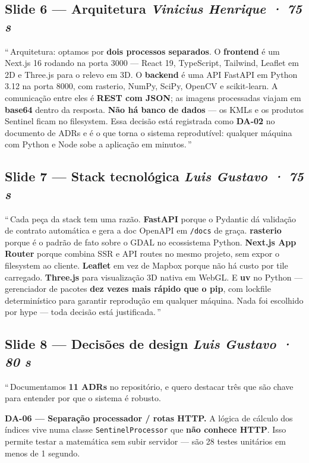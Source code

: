 \documentclass[12pt,a4paper]{article}
\begin{document}
\subsection*{Slide 6 — Arquitetura \hfill \textit{Vinicius Henrique · 75 s}}

\textquotedblleft\,Arquitetura: optamos por \textbf{dois processos
separados}. O \textbf{frontend} é um Next.js 16 rodando na porta 3000 —
React 19, TypeScript, Tailwind, Leaflet em 2D e Three.js para o relevo em
3D. O \textbf{backend} é uma API FastAPI em Python 3.12 na porta 8000,
com rasterio, NumPy, SciPy, OpenCV e scikit-learn. A comunicação entre
eles é \textbf{REST com JSON}; as imagens processadas viajam em
\textbf{base64} dentro da resposta. \textbf{Não há banco de dados} — os
KMLs e os produtos Sentinel ficam no filesystem. Essa decisão está
registrada como \textbf{DA-02} no documento de ADRs e é o que torna o
sistema reprodutível: qualquer máquina com Python e Node sobe a
aplicação em minutos.\,\textquotedblright

\subsection*{Slide 7 — Stack tecnológica \hfill \textit{Luis Gustavo · 75 s}}

\textquotedblleft\,Cada peça da stack tem uma razão. \textbf{FastAPI}
porque o Pydantic dá validação de contrato automática e gera a doc
OpenAPI em \texttt{/docs} de graça. \textbf{rasterio} porque é o padrão
de fato sobre o GDAL no ecossistema Python. \textbf{Next.js App Router}
porque combina SSR e API routes no mesmo projeto, sem expor o
filesystem ao cliente. \textbf{Leaflet} em vez de Mapbox porque não há
custo por tile carregado. \textbf{Three.js} para visualização 3D nativa
em WebGL. E \textbf{uv} no Python — gerenciador de pacotes
\textbf{dez vezes mais rápido que o pip}, com lockfile determinístico
para garantir reprodução em qualquer máquina. Nada foi escolhido por
hype — toda decisão está justificada.\,\textquotedblright

\subsection*{Slide 8 — Decisões de design \hfill \textit{Luis Gustavo · 80 s}}

\textquotedblleft\,Documentamos \textbf{11 ADRs} no repositório, e
quero destacar três que são chave para entender por que o sistema é
robusto.

\textbf{DA-06 — Separação processador / rotas HTTP.} A lógica de
cálculo dos índices vive numa classe \texttt{SentinelProcessor} que
\textbf{não conhece HTTP}. Isso permite testar a matemática sem subir
servidor — são 28 testes unitários em menos de 1 segundo.
\end{document}
